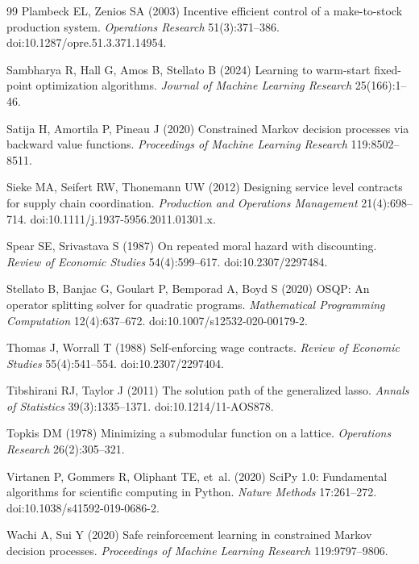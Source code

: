 \documentclass[11pt,letterpaper]{article}
\theoremstyle{definition}
\newcommand{\1}{\mathbf 1}
\begin{document}
\begin{thebibliography}{99}
Plambeck EL, Zenios SA (2003) Incentive efficient control of a make-to-stock production system. \emph{Operations Research} 51(3):371--386. doi:10.1287/opre.51.3.371.14954.

Sambharya R, Hall G, Amos B, Stellato B (2024) Learning to warm-start fixed-point optimization algorithms. \emph{Journal of Machine Learning Research} 25(166):1--46.

Satija H, Amortila P, Pineau J (2020) Constrained Markov decision processes via backward value functions. \emph{Proceedings of Machine Learning Research} 119:8502--8511.

Sieke MA, Seifert RW, Thonemann UW (2012) Designing service level contracts for supply chain coordination. \emph{Production and Operations Management} 21(4):698--714. doi:10.1111/j.1937-5956.2011.01301.x.

Spear SE, Srivastava S (1987) On repeated moral hazard with discounting. \emph{Review of Economic Studies} 54(4):599--617. doi:10.2307/2297484.

Stellato B, Banjac G, Goulart P, Bemporad A, Boyd S (2020) OSQP: An operator splitting solver for quadratic programs. \emph{Mathematical Programming Computation} 12(4):637--672. doi:10.1007/s12532-020-00179-2.

Thomas J, Worrall T (1988) Self-enforcing wage contracts. \emph{Review of Economic Studies} 55(4):541--554. doi:10.2307/2297404.

Tibshirani RJ, Taylor J (2011) The solution path of the generalized lasso. \emph{Annals of Statistics} 39(3):1335--1371. doi:10.1214/11-AOS878.

Topkis DM (1978) Minimizing a submodular function on a lattice. \emph{Operations Research} 26(2):305--321.



Virtanen P, Gommers R, Oliphant TE, et~al. (2020) SciPy 1.0: Fundamental algorithms for scientific computing in Python. \emph{Nature Methods} 17:261--272. doi:10.1038/s41592-019-0686-2.

Wachi A, Sui Y (2020) Safe reinforcement learning in constrained Markov decision processes. \emph{Proceedings of Machine Learning Research} 119:9797--9806.


\end{thebibliography}


\label{r19-reference-end}
\end{document}
